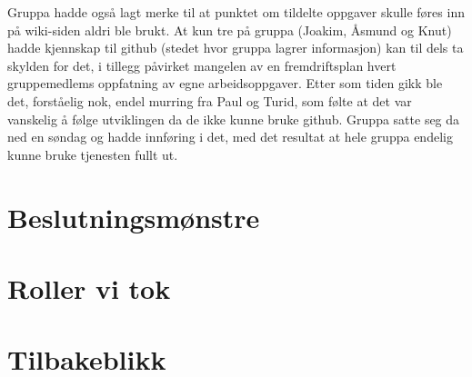 Gruppa hadde også lagt merke til at punktet om tildelte oppgaver skulle føres
inn på wiki-siden aldri ble brukt. At kun tre på gruppa (Joakim, Åsmund og Knut)
hadde kjennskap til github (stedet hvor gruppa lagrer informasjon) kan til dels
ta skylden for det, i tillegg påvirket mangelen av en fremdriftsplan hvert
gruppemedlems oppfatning av egne arbeidsoppgaver. Etter som tiden gikk ble det,
forståelig nok, endel murring fra Paul og Turid, som følte at det var vanskelig
å følge utviklingen da de ikke kunne bruke github. Gruppa satte seg da ned en
søndag og hadde innføring i det, med det resultat at hele gruppa endelig kunne
bruke tjenesten fullt ut.

\section{Beslutningsmønstre}

\section{Roller vi tok}

\section{Tilbakeblikk}
